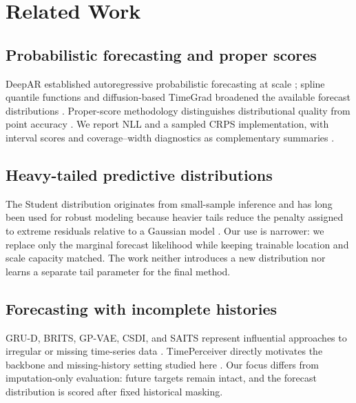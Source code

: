 \section{Related Work}
\label{sec:related-work}

\subsection{Probabilistic forecasting and proper scores}
DeepAR established autoregressive probabilistic forecasting at scale \citep{salinas2020deepar}; spline quantile functions and diffusion-based TimeGrad broadened the available forecast distributions \citep{gasthaus2019spline,rasul2021timegrad}. Proper-score methodology distinguishes distributional quality from point accuracy \citep{matheson1976crps,gneiting2007proper,gneiting2007calibration,gneiting2014probabilistic}. We report NLL and a sampled CRPS implementation, with interval scores and coverage--width diagnostics as complementary summaries \citep{winkler1972interval,jordan2019scoringrules}.

\subsection{Heavy-tailed predictive distributions}
The Student distribution originates from small-sample inference \citep{student1908} and has long been used for robust modeling because heavier tails reduce the penalty assigned to extreme residuals relative to a Gaussian model \citep{lange1989robust}. Our use is narrower: we replace only the marginal forecast likelihood while keeping trainable location and scale capacity matched. The work neither introduces a new distribution nor learns a separate tail parameter for the final method.

\subsection{Forecasting with incomplete histories}
GRU-D, BRITS, GP-VAE, CSDI, and SAITS represent influential approaches to irregular or missing time-series data \citep{che2018grud,cao2018brits,fortuin2020gpvae,tashiro2021csdi,du2023saits}. TimePerceiver directly motivates the backbone and missing-history setting studied here \citep{lee2025timeperceiver}. Our focus differs from imputation-only evaluation: future targets remain intact, and the forecast distribution is scored after fixed historical masking.

